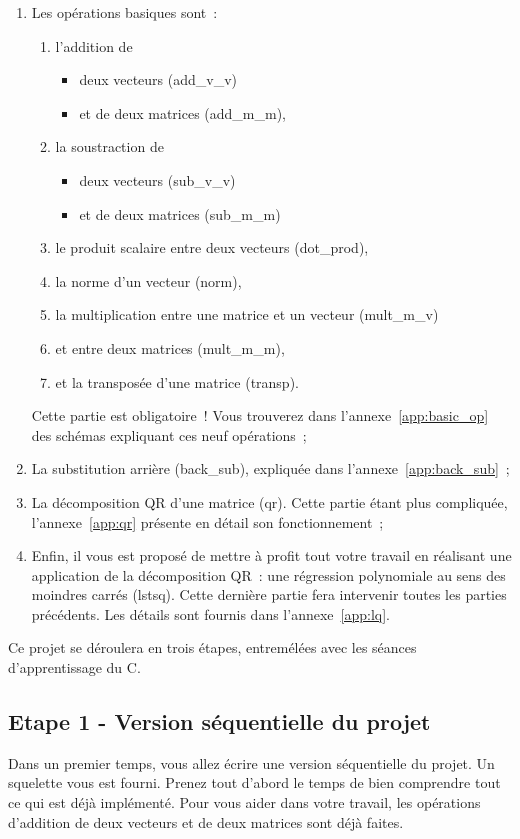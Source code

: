 \documentclass[a4paper, 12pt]{article}
\begin{document}
\begin{enumerate}
    \item Les opérations basiques sont~: 
    \begin{enumerate}
        \item l'addition de 
        \begin{itemize}
            \item deux vecteurs (add\_v\_v)
            \item et de deux matrices (add\_m\_m),
        \end{itemize}
        \item la soustraction de
        \begin{itemize}
            \item deux vecteurs (sub\_v\_v) 
            \item et de deux matrices (sub\_m\_m)
        \end{itemize}
        \item le produit scalaire entre deux vecteurs (dot\_prod),
        \item la norme d'un vecteur (norm),
        \item la multiplication entre une matrice et un vecteur (mult\_m\_v)
        \item et entre deux matrices (mult\_m\_m),
        \item et la transposée d'une matrice (transp).
    \end{enumerate}  
    Cette partie est obligatoire~! Vous trouverez dans l'annexe~\ref{app:basic_op} des schémas expliquant ces neuf opérations~;
    \item La substitution arrière (back\_sub), expliquée dans l'annexe~\ref{app:back_sub}~;
    \item La décomposition QR d'une matrice (qr). Cette partie étant plus compliquée, l'annexe~\ref{app:qr} présente en détail son fonctionnement~;
    \item Enfin, il vous est proposé de mettre à profit tout votre travail en réalisant une application de la décomposition QR~: une régression polynomiale au sens des moindres carrés (lstsq). Cette dernière partie fera intervenir toutes les parties précédents. Les détails sont fournis dans l'annexe~\ref{app:lq}.
\end{enumerate}

\noindent Ce projet se déroulera en trois étapes, entremélées avec les séances d'apprentissage du C.

\subsection*{Etape 1 - Version séquentielle du projet}
Dans un premier temps, vous allez écrire une version séquentielle du projet. Un squelette vous est fourni. Prenez tout d'abord le temps de bien comprendre tout ce qui est déjà implémenté. Pour vous aider dans votre travail, les opérations d'addition de deux vecteurs et de deux matrices sont déjà faites. 
\end{document}
